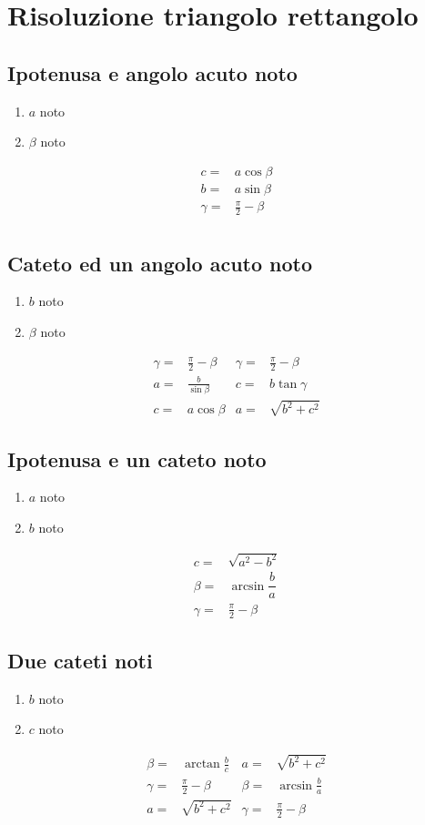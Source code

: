 \chapter{Risoluzione triangolo rettangolo}
{\centering
	
	\par}
\section{Ipotenusa e angolo acuto noto}
\begin{enumerate}
	\item $a$ noto
	\item $\beta$ noto
\end{enumerate}
\begin{align*}
c=&a\cos\beta\\
b=&a\sin\beta\\
\gamma=&\frac{\pi}{2}-\beta\\
\end{align*}
\section{Cateto ed un angolo acuto noto}
\begin{enumerate}
	\item $b$ noto
	\item $\beta$ noto
\end{enumerate}
\begin{align*}
\gamma=&\frac{\pi}{2}-\beta&\gamma=&\frac{\pi}{2}-\beta\\
a=&\frac{b}{\sin\beta}&c=&b\tan\gamma\\
c=&a\cos\beta&a=&\sqrt{b^2+c^2}
\end{align*}
\section{Ipotenusa e un cateto noto}
\begin{enumerate}
	\item $a$ noto
	\item $b$ noto
\end{enumerate}
\begin{align*}
c=&\sqrt{a^2-b^2}\\
\beta=&\arcsin\dfrac{b}{a}\\
\gamma=&\frac{\pi}{2}-\beta
\end{align*}
\section{Due cateti noti}
\begin{enumerate}
	\item $b$ noto
	\item $c$ noto
\end{enumerate}
\begin{align*}
\beta=&\arctan\frac{b}{c}&a=&\sqrt{b^2+c^2}\\
\gamma=&\frac{\pi}{2}-\beta&\beta=&\arcsin\frac{b}{a}\\
a=&\sqrt{b^2+c^2}&\gamma=&\frac{\pi}{2}-\beta\\
\end{align*}